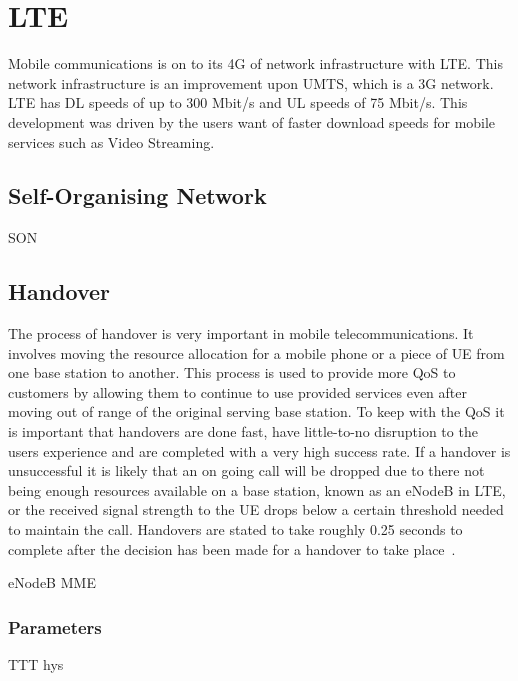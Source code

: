 \chapter{LTE}\label{lte}
Mobile communications is on to its \ac{4G} of network infrastructure with \ac{LTE}. This network infrastructure is an improvement upon \ac{UMTS}, which is a \ac{3G} network. \ac{LTE} has \ac{DL} speeds of up to 300 Mbit/s and \ac{UL} speeds of 75 Mbit/s. This development was driven by the users want of faster download speeds for mobile services such as Video Streaming.
\section{Self-Organising Network}\label{self organising network}
\ac{SON}~\cite{feng2008self}
\section{Handover}\label{handover}
The process of handover is very important in mobile telecommunications. It involves moving the resource allocation for a mobile phone or a piece of \ac{UE} from one base station to another. This process is used to provide more \ac{QoS} to customers by allowing them to continue to use provided services even after moving out of range of the original serving base station. To keep with the QoS it is important that handovers are done fast, have little-to-no disruption to the users experience and are completed with a very high success rate. If a handover is unsuccessful it is likely that an on going call will be dropped due to there not being enough resources available on a base station, known as an \ac{eNodeB} in \ac{LTE}, or the received signal strength to the \ac{UE} drops below a certain threshold needed to maintain the call. Handovers are stated to take roughly 0.25 seconds to complete after the decision has been made for a handover to take place~\cite{3gpp2012triggers}.

\ac{eNodeB} \ac{MME}

\subsection{Parameters}\label{parameters}
\ac{TTT} \ac{hys}

